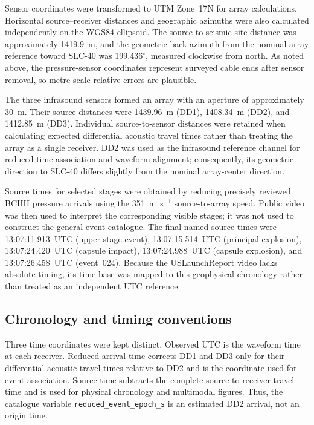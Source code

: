 \documentclass[]{seismica}
\begin{document}
Sensor coordinates were transformed to UTM Zone~17N for array calculations.
Horizontal source--receiver distances and geographic azimuths were also
calculated independently on the WGS84 ellipsoid. The source-to-seismic-site
distance was approximately 1419.9~m, and the geometric back azimuth from the
nominal array reference toward SLC-40 was 199.436$^\circ$, measured clockwise
from north. As noted above, the pressure-sensor coordinates represent surveyed
cable ends after sensor removal, so metre-scale relative errors are plausible.

The three infrasound sensors formed an array with an aperture of approximately
30~m. Their source distances were 1439.96~m (DD1), 1408.34~m (DD2), and
1412.85~m (DD3). Individual
source-to-sensor distances were retained when calculating expected
differential acoustic travel times rather than treating the array as a single
receiver. DD2 was used as the infrasound reference channel for reduced-time
association and waveform alignment; consequently, its geometric direction to
SLC-40 differs slightly from the nominal array-center direction.

Source times for selected stages were obtained by reducing precisely reviewed
BCHH pressure arrivals using the 351~m~s$^{-1}$ source-to-array speed. Public
video was then used to interpret the corresponding visible stages; it was not
used to construct the general event catalogue. The final named source times
were 13:07:11.913~UTC (upper-stage event), 13:07:15.514~UTC (principal
explosion), 13:07:24.420~UTC (capsule impact), 13:07:24.988~UTC (capsule
explosion), and 13:07:26.458~UTC (event~024). Because the USLaunchReport video
lacks absolute timing, its time base was mapped to this geophysical chronology
rather than treated as an independent UTC reference.

\subsection{Chronology and timing conventions}
\label{sec:methods_legacy_chronology}

Three time coordinates were kept distinct. Observed UTC is the waveform time at
each receiver. Reduced arrival time corrects DD1 and DD3 only for their
differential acoustic travel times relative to DD2 and is the coordinate used
for event association. Source time subtracts the complete source-to-receiver
travel time and is used for physical chronology and multimodal figures. Thus,
the catalogue variable \texttt{reduced\_event\_epoch\_s} is an estimated DD2
arrival, not an origin time.
\end{document}
